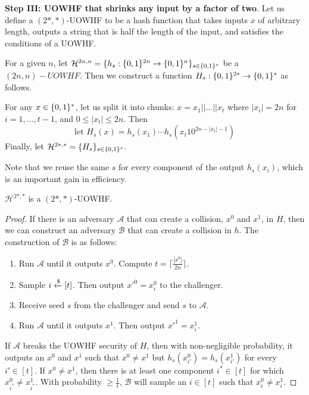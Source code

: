 \noindent\textbf{Step III: UOWHF that shrinks any input by a factor of two}.
Let us define a $(2{*}, {*})$-UOWHF to be a hash function that takes inputs $x$ of arbitrary length, outputs a string that is half the length of the input, and satisfies the conditions of a UOWHF.

\begin{construction}[a $(2{*}, {*})$-UOWHF]
    For a given $n$, let $\mathcal{H}^{2n, n} = \{h_s:\{0,1\}^{2n}\rightarrow\{0,1\}^{n}\}_{s\in\{0,1\}^{*}}$ be a $(2n, n)-UOWHF$. Then we construct a function $H_s:\{0,1\}^{2*} \to \{0,1\}^*$ as follows. 
    
    For any $x \in \{0,1\}^*$, let us split it into chunks: $x=x_1 || \dots || x_t$ where $|x_i|=2n$ for $i=1,\dots,t-1$, and $0\leq|x_t|\leq 2n$. Then
    \[
    \text{let } H_s(x)=h_s(x_1)\cdots h_s(x_{t}10^{2n-|x_t|-1})
    \]
    Finally, let $\mathcal{H}^{2*, *} = \{H_s\}_{s \in \{0,1\}^*}$.
\end{construction}
Note that we reuse the same $s$ for every component of the output $h_s(x_i)$, which is an important gain in efficiency.

\begin{claim}
    $\mathcal{H}^{2*, *}$ is a $(2{*}, {*})$-UOWHF.
\end{claim}
\begin{proof}
If there is an adversary $\mathcal{A}$ that can create a collision, $x^0$ and $x^1$, in $H$, then we can construct an adversary $\mathcal{B}$ that can create a collision in $h$. The construction of $\mathcal{B}$ is as follows:
\begin{enumerate}
    \item Run $\mathcal{A}$ until it outputs $x^0$. Compute $t = \lceil\frac{|x^0|}{2n}\rceil$.
    \item Sample $i \xleftarrow{\$} [t]$. Then output $x'^0 = x^0_{i}$ to the challenger.
    \item Receive seed $s$ from the challenger and send $s$ to $\mathcal{A}$.
    \item Run $\mathcal{A}$ until it outputs $x^1$. Then output $x'^1 = x^1_{i}$.
\end{enumerate}

If $\mathcal{A}$ breaks the UOWHF security of $H$, then with non-negligible probability, it outputs an $x^0$ and $x^1$ such that $x^0 \neq x^1$ but $h_s(x^0_{i'})=h_s(x^1_{i'})$ for every $i' \in [t]$. If $x^0 \neq x^1$, then there is at least one component $i^* \in [t]$ for which $x^0_{i^*} \neq x^1_{i^*}$. With probability $\geq \frac{1}{t}$, $\mathcal{B}$ will sample an $i \in [t]$ such that $x^0_{i} \neq x^1_{i}$.
\end{proof}
\vspace{5mm}

